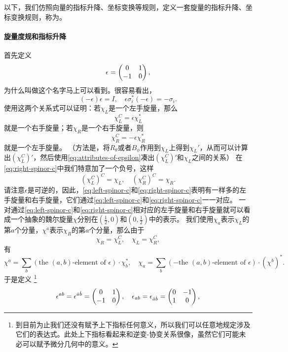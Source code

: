 以下，我们仿照向量的指标升降、坐标变换等规则，定义一套旋量的指标升降、坐标变换规则，称为。

\paragraph{旋量度规和指标升降} 首先定义
\begin{equation}
    \epsilon = \pmqty{0 & 1 \\ -1 & 0},
\end{equation}
为什么叫做这个名字马上可以看到。很容易看出，
\begin{equation}
    (-\epsilon) \epsilon = I, \quad \epsilon \sigma_i^* (-\epsilon) = - \sigma_i. 
    \label{eq:attributes-of-epsilon}
\end{equation}
使用这两个关系式可以证明：若$\chi_L$是一个左手旋量，那么
\begin{equation}
    \chi_L^C = \epsilon\chi_L^*
    \label{eq:left-spinor-c}
\end{equation}
就是一个右手旋量；若$\chi_R$是一个右手旋量，则
\begin{equation}
    \chi_R^C = -\epsilon \chi_R^*
    \label{eq:right-spinor-c}
\end{equation}
就是一个左手旋量。
（方法是，将$R_\theta$或者$B_\phi$作用到$\chi_L$上得到$\chi_L'$，从而可以计算出$(\chi_L^C)'$，然后使用\eqref{eq:attributes-of-epsilon}凑出$(\chi_L^C)'$和$\chi_L$之间的关系）
在\eqref{eq:right-spinor-c}中我们特意加了一个负号，这样
\[
    (\chi_L^C)^C = \chi_L, \quad (\chi_R^C)^C = \chi_R.
\]
请注意$\epsilon$是可逆的，因此，\eqref{eq:left-spinor-c}和\eqref{eq:right-spinor-c}表明有一样多的左手旋量和右手旋量，它们通过\eqref{eq:left-spinor-c}和\eqref{eq:right-spinor-c}一一对应。
一对通过\eqref{eq:left-spinor-c}和\eqref{eq:right-spinor-c}相对应的左手旋量和右手旋量就可以看成一个抽象的魏尔旋量$\chi$分别在$(\frac{1}{2},0)$和$(0, \frac{1}{2})$中的表示。
我们使用$\chi_a$表示$\chi_L$的第$a$个分量，$\chi^{\dot{a}}$表示$\chi_R$的第$a$个分量，那么由于
\[
    \chi_R = \chi_L^C, \quad \chi_L = \chi_R^C,
\]
有
\[
    \chi^{\dot{a}} = \sum_b (\text{the $(a,b)$-element of $\epsilon$}) \cdot \chi_b^*, \quad \chi_a = \sum_b ( - \text{the $(a,b)$-element of $\epsilon$}) \cdot (\chi^{\dot{b}})^*.
\]
于是定义%
\footnote{到目前为止我们还没有赋予上下指标任何意义，所以我们可以任意地规定涉及它们的表达式。此处上下指标看起来和逆变-协变关系很像，虽然它们可能未必可以赋予微分几何中的意义。}
\begin{equation}
    \epsilon^{ab} = \epsilon^{\dot{a} \dot{b}} = \pmqty{0 & 1 \\ -1 & 0}, \quad \epsilon_{ab} = \epsilon_{\dot{a} \dot{b}} = \pmqty{0 & -1 \\ 1 & 0},
\end{equation}
